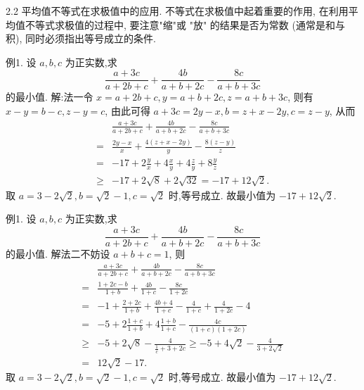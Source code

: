 
2.2 平均值不等式在求极值中的应用.
不等式在求极值中起着重要的作用, 在利用平均值不等式求极值的过程中, 要注意"缩"或 "放" 的结果是否为常数 (通常是和与积), 同时必须指出等号成立的条件.



例1. 设 $a, b, c$ 为正实数,求
$$
\frac{a+3 c}{a+2 b+c}+\frac{4 b}{a+b+2 c}-\frac{8 c}{a+b+3 c}
$$
的最小值.
解:法一令 $x=a+2 b+c, y=a+b+2 c, z=a+b+3 c$, 则有 $x- y=b-c, z-y=c$, 由此可得 $a+3 c=2 y-x, b=z+x-2 y, c=z- y$, 从而
$$
\begin{aligned}
& \frac{a+3 c}{a+2 b+c}+\frac{4 b}{a+b+2 c}-\frac{8 c}{a+b+3 c} \\
= & \frac{2 y-x}{x}+\frac{4(z+x-2 y)}{y}-\frac{8(z-y)}{z} \\
= & -17+2 \frac{y}{x}+4 \frac{x}{y}+4 \frac{z}{y}+8 \frac{y}{z} \\
\geqslant & -17+2 \sqrt{8}+2 \sqrt{32}=-17+12 \sqrt{2} .
\end{aligned}
$$
取 $a=3-2 \sqrt{2}, b=\sqrt{2}-1, c=\sqrt{2}$ 时,等号成立.
故最小值为 $-17+12 \sqrt{2}$.



例1. 设 $a, b, c$ 为正实数,求
$$
\frac{a+3 c}{a+2 b+c}+\frac{4 b}{a+b+2 c}-\frac{8 c}{a+b+3 c}
$$
的最小值.
解法二不妨设 $a+b+c=1$, 则
$$
\begin{aligned}
& \frac{a+3 c}{a+2 b+c}+\frac{4 b}{a+b+2 c}-\frac{8 c}{a+b+3 c} \\
= & \frac{1+2 c-b}{1+b}+\frac{4 b}{1+c}-\frac{8 c}{1+2 c} \\
= & -1+\frac{2+2 c}{1+b}+\frac{4 b+4}{1+c}-\frac{4}{1+c}+\frac{4}{1+2 c}-4 \\
= & -5+2 \frac{1+c}{1+b}+4 \frac{1+b}{1+c}-\frac{4 c}{(1+c)(1+2 c)} \\
\geqslant & -5+2 \sqrt{8}-\frac{4}{\frac{1}{c}+3+2 c} \geqslant-5+4 \sqrt{2}-\frac{4}{3+2 \sqrt{2}} \\
= & 12 \sqrt{2}-17 .
\end{aligned}
$$
取 $a=3-2 \sqrt{2}, b=\sqrt{2}-1, c=\sqrt{2}$ 时,等号成立.
故最小值为 $-17+12 \sqrt{2}$.



